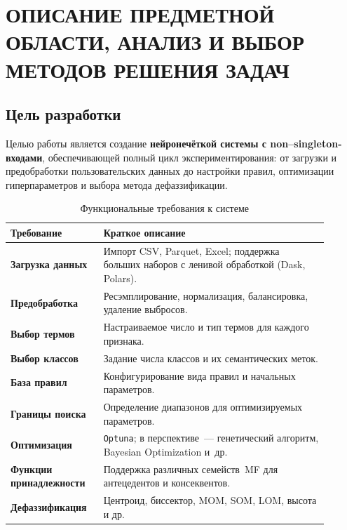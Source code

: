 \section{ОПИСАНИЕ ПРЕДМЕТНОЙ ОБЛАСТИ, АНАЛИЗ И ВЫБОР МЕТОДОВ РЕШЕНИЯ ЗАДАЧ}
\eskdrerun{}
\label{sec:software_design}

\subsection{Цель разработки}
\label{subsec:goal}

Целью работы является создание \textbf{нейронечёткой системы с non--singleton-входами}, обеспечивающей полный цикл экспериментирования: от загрузки и предобработки пользовательских данных до настройки правил, оптимизации гиперпараметров и выбора метода дефаззификации.  

\begin{table}[h]
\centering\small
\caption{Функциональные требования к системе}
\label{tab:req}
\begin{tabular}{p{0.25\linewidth}p{0.65\linewidth}}
\toprule
Требование & Краткое описание \\
\midrule
\textbf{Загрузка данных} & Импорт CSV, Parquet, Excel; поддержка больших наборов с ленивой обработкой (Dask, Polars).\\
\textbf{Предобработка} & Ресэмплирование, нормализация, балансировка, удаление выбросов.\\
\textbf{Выбор термов} & Настраиваемое число и тип термов для каждого признака.\\
\textbf{Выбор классов} & Задание числа классов и их семантических меток.\\
\textbf{База правил} & Конфигурирование вида правил и начальных параметров.\\
\textbf{Границы поиска} & Определение диапазонов для оптимизируемых параметров.\\
\textbf{Оптимизация} & \texttt{Optuna}; в перспективе~--- генетический алгоритм, Bayesian Optimization и~др.\\
\textbf{Функции принадлежности} & Поддержка различных семейств~MF для антецедентов и консеквентов.\\
\textbf{Дефаззификация} & Центроид, биссектор, MOM, SOM, LOM, высота и др. \\
\bottomrule
\end{tabular}
\end{table}

